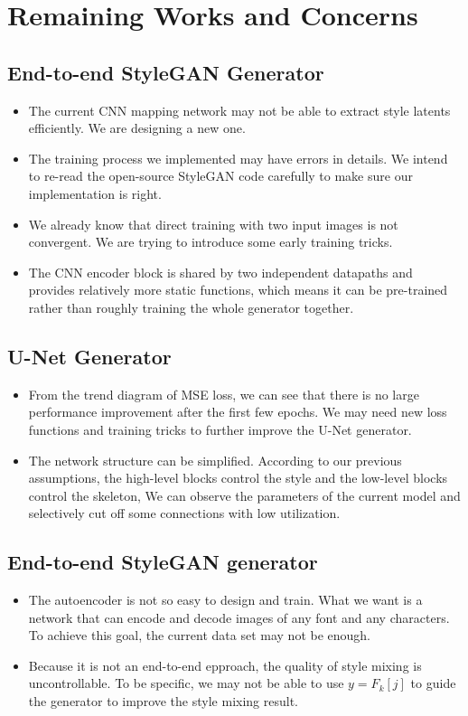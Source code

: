 \documentclass[letterpaper]{article}
\begin{document}
\section{Remaining Works and Concerns}
\subsection{End-to-end StyleGAN Generator}
\begin{itemize}
    \item The current CNN mapping network may not be able to extract style latents efficiently. We are designing a new one.
    \item The training process we implemented may have errors in details. We intend to re-read the open-source StyleGAN code carefully to make sure our implementation is right.
    \item We already know that direct training with two input images is not convergent. We are trying to introduce some early training tricks.
    \item The CNN encoder block is shared by two independent datapaths and provides relatively more static functions, which means it can be pre-trained rather than roughly training the whole generator together.
\end{itemize}

\subsection{U-Net Generator}
\begin{itemize}
    \item From the trend diagram of MSE loss, we can see that there is no large performance improvement after the first few epochs. We may need new loss functions and training tricks to further improve the U-Net generator.
    \item The network structure can be simplified. According to our previous assumptions, the high-level blocks control the style and the low-level blocks control the skeleton, We can observe the parameters of the current model and selectively cut off some connections with low utilization.
\end{itemize}

\subsection{End-to-end StyleGAN generator}
\begin{itemize}
    \item The autoencoder is not so easy to design and train. What we want is a network that can encode and decode images of any font and any characters. To achieve this goal, the current data set may not be enough.
    \item Because it is not an end-to-end epproach, the quality of style mixing is uncontrollable. To be specific, we may not be able to use $y=F_k[j]$ to guide the generator to improve the style mixing result.
\end{itemize}
\end{document}
